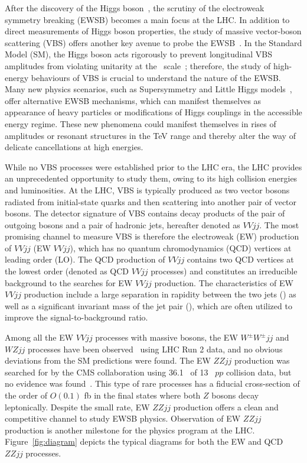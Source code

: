 After the discovery of the Higgs boson~\cite{HIGG-2012-27,CMS-HIG-12-028}, the scrutiny of the electroweak symmetry breaking (EWSB) becomes a main focus at the LHC. In addition to direct measurements of Higgs boson properties, the study of massive vector-boson scattering (VBS) offers another key avenue to probe the EWSB~\cite{Lee:1977yc,Chanowitz:1985hj,Szleper:2014xxa}. In the Standard Model (SM), the Higgs boson acts rigorously to prevent longitudinal VBS amplitudes from violating unitarity at the \TeV~scale~\cite{Lee:1977yc}; therefore, the study of high-energy behaviours of VBS is crucial to understand the nature of the EWSB. Many new physics scenarios, such as Supersymmetry and Little Higgs models~\cite{ArkaniHamed:2002qy}, offer alternative EWSB mechanisms, which can manifest themselves as appearance of heavy particles or modifications of Higgs couplings in the accessible energy regime.
These new phenomena could manifest themselves in rises of amplitudes or resonant structures in the TeV range and thereby alter the way of delicate cancellations at high energies.

While no VBS processes were established prior to the LHC era, the LHC provides an unprecedented opportunity to study them, owing to its high collision energies and luminosities. At the LHC, VBS is typically produced as two vector bosons radiated from initial-state quarks and then scattering into another pair of vector bosons. The detector signature of VBS contains decay products of the pair of outgoing bosons and a pair of hadronic jets, hereafter denoted as $VVjj$. The most promising channel to measure VBS is therefore the electroweak (EW) production of $VVjj$ (EW $VVjj$), which has no quantum chromodynamics (QCD) vertices at leading order (LO).
The QCD production of $VVjj$ contains two QCD vertices at the lowest order (denoted as QCD $VVjj$ processes) and constitutes an irreducible background to the searches for EW $VVjj$ production. The characteristics of EW $VVjj$ production include a large separation in rapidity between the two jets (\dyjj) as well as a significant invariant mass of the jet pair (\mjj), which are often utilized to improve the signal-to-background ratio. 

Among all the EW $VVjj$ processes with massive bosons, the EW $W^{\pm}W^{\pm}jj$ and $WZjj$ processes have been observed~\cite{Aaboud:2019nmv,Aaboud:2018ddq,Sirunyan:2017ret} using LHC Run 2 data, and no obvious deviations from the SM predictions were found. The EW $ZZjj$ production was searched for by the CMS collaboration using 36.1 \ifb~of 13 \TeV~$pp$ collision data, but no evidence was found~\cite{Sirunyan:2017fvv}. This type of rare processes has a fiducial cross-section of the order of $O(0.1)$ fb in the final states where both $Z$ bosons decay leptonically.
Despite the small rate, EW $ZZjj$ production offers a clean and competitive channel to study EWSB physics. Observation of EW $ZZjj$ production is another milestone for the physics program at the LHC. Figure~\ref{fig:diagram} depicts the typical diagrams for both the EW and QCD $ZZjj$ processes. 

